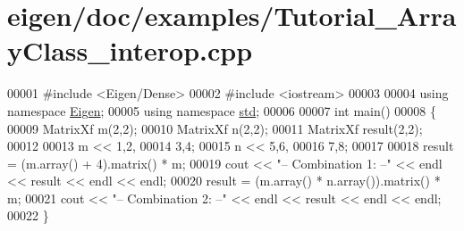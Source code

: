 \hypertarget{eigen_2doc_2examples_2_tutorial___array_class__interop_8cpp_source}{}\section{eigen/doc/examples/\+Tutorial\+\_\+\+Array\+Class\+\_\+interop.cpp}
\label{eigen_2doc_2examples_2_tutorial___array_class__interop_8cpp_source}

\begin{DoxyCode}
00001 \textcolor{preprocessor}{#include <Eigen/Dense>}
00002 \textcolor{preprocessor}{#include <iostream>}
00003 
00004 \textcolor{keyword}{using namespace }\hyperlink{namespace_eigen}{Eigen};
00005 \textcolor{keyword}{using namespace }\hyperlink{namespacestd}{std};
00006 
00007 \textcolor{keywordtype}{int} main()
00008 \{
00009   MatrixXf m(2,2);
00010   MatrixXf n(2,2);
00011   MatrixXf result(2,2);
00012 
00013   m << 1,2,
00014        3,4;
00015   n << 5,6,
00016        7,8;
00017   
00018   result = (m.array() + 4).matrix() * m;
00019   cout << \textcolor{stringliteral}{"-- Combination 1: --"} << endl << result << endl << endl;
00020   result = (m.array() * n.array()).matrix() * m;
00021   cout << \textcolor{stringliteral}{"-- Combination 2: --"} << endl << result << endl << endl;
00022 \}
\end{DoxyCode}
